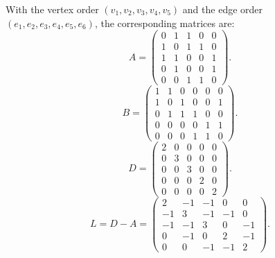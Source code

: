 \documentclass[11pt, a4paper]{ctexrep}
\begin{document}
\begin{example}
    With the vertex order $(v_1,v_2,v_3,v_4,v_5)$ and the edge order $(e_1,e_2,e_3,e_4,e_5,e_6)$, the corresponding matrices are:
    \[
        A=
        \begin{pmatrix}
            0 & 1 & 1 & 0 & 0 \\
            1 & 0 & 1 & 1 & 0 \\
            1 & 1 & 0 & 0 & 1 \\
            0 & 1 & 0 & 0 & 1 \\
            0 & 0 & 1 & 1 & 0
        \end{pmatrix}.
    \]
    \[
        B=
        \begin{pmatrix}
            1 & 1 & 0 & 0 & 0 & 0 \\
            1 & 0 & 1 & 0 & 0 & 1 \\
            0 & 1 & 1 & 1 & 0 & 0 \\
            0 & 0 & 0 & 0 & 1 & 1 \\
            0 & 0 & 0 & 1 & 1 & 0
        \end{pmatrix}.
    \]
    \[
        D=
        \begin{pmatrix}
            2 & 0 & 0 & 0 & 0 \\
            0 & 3 & 0 & 0 & 0 \\
            0 & 0 & 3 & 0 & 0 \\
            0 & 0 & 0 & 2 & 0 \\
            0 & 0 & 0 & 0 & 2
        \end{pmatrix}.
    \]
    \[
        L=D-A=
        \begin{pmatrix}
            2  & -1 & -1 & 0  & 0  \\
            -1 & 3  & -1 & -1 & 0  \\
            -1 & -1 & 3  & 0  & -1 \\
            0  & -1 & 0  & 2  & -1 \\
            0  & 0  & -1 & -1 & 2
        \end{pmatrix}.
    \]


\end{example}
\end{document}
